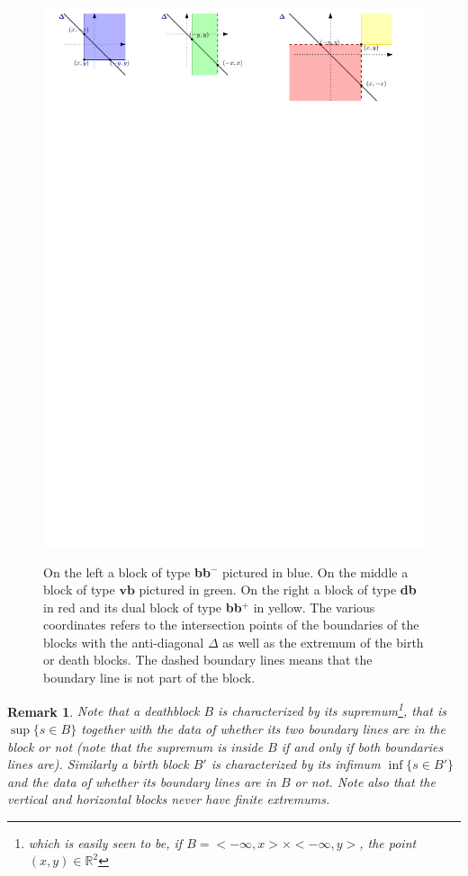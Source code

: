\documentclass[a4paper, english, 11pt]{article}
\newcommand{\0}{\vec{0}}
\newcommand{\R}[0]{\mathbb{R}}
\newtheorem{remark}[prop]{Remark}
\begin{document}
\begin{figure}
\begin{center}
\includegraphics[scale=0.9]{Blocks.pdf}\label{fig:blocks}
\caption{On the left a block of type \textbf{bb}$^{-}$ pictured in blue. On the middle a block of type $\textbf{vb}$ pictured in green. On the right 
a block of type \textbf{db} in red and its dual block of type \textbf{bb}$^{+}$ in yellow.
The various coordinates refers to the intersection points of the boundaries of the blocks with the anti-diagonal $\Delta$ as well as the extremum of the birth or death blocks.
The dashed boundary lines means that the boundary line is not part of the block.}
\end{center}
\end{figure}
\begin{remark}\label{R;dualBlocks}
Note that a deathblock $B$ is characterized by its supremum\footnote{which is easily seen to be, if $B= <-\infty, x> \times <-\infty,y>$, the point $(x,y)\in \R^2$}, that is $\sup \{s\in B\}$ together with the data of whether its two boundary lines are in the block or not (note that the supremum is inside $B$ if and only if both boundaries lines are). 
Similarly a birth block $B'$  is characterized by its infimum $\inf \{s\in B'\}$ and the data of whether its boundary lines are in $B$ or not.  Note also that the vertical and horizontal blocks never have finite extremums.  
\end{remark}
\end{document}
